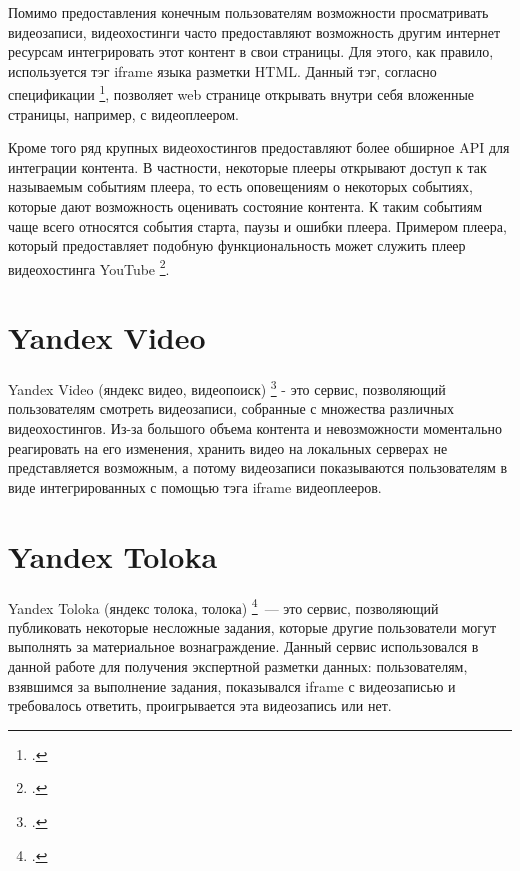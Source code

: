 Помимо предоставления конечным пользователям возможности просматривать видеозаписи, видеохостинги часто предоставляют возможность другим интернет ресурсам интегрировать этот контент в свои страницы. Для этого, как правило, используется тэг iframe языка разметки HTML. Данный тэг, согласно спецификации \footcite{HTML53}, позволяет web странице открывать внутри себя вложенные страницы, например, с видеоплеером.

Кроме того ряд крупных видеохостингов предоставляют более обширное API для интеграции контента. В частности, некоторые плееры открывают доступ к так называемым событиям плеера, то есть оповещениям о некоторых событиях, которые дают возможность оценивать состояние контента. К таким событиям чаще всего относятся события старта, паузы и ошибки плеера. Примером плеера, который предоставляет подобную функциональность может служить плеер видеохостинга YouTube \footcite{YouTubeAPI}.

\section{Yandex Video}

Yandex Video (яндекс видео, видеопоиск) \footcite{VideoSearch} - это сервис, позволяющий пользователям смотреть видеозаписи, собранные с множества различных видеохостингов. Из-за большого объема контента и невозможности моментально реагировать на его изменения, хранить видео на локальных серверах не представляется возможным, а потому видеозаписи показываются пользователям в виде интегрированных с помощью тэга iframe видеоплееров.

\section{Yandex Toloka}

Yandex Toloka (яндекс толока, толока) \footcite{Toloka}~--- это сервис, позволяющий публиковать некоторые несложные задания, которые другие пользователи могут выполнять за материальное вознаграждение. Данный сервис использовался в данной работе для получения экспертной разметки данных: пользователям, взявшимся за выполнение задания, показывался iframe с видеозаписью и требовалось ответить, проигрывается эта видеозапись или нет.